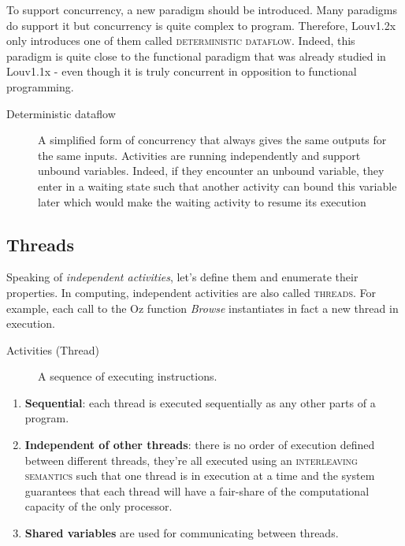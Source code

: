 \documentclass[11pt,a4paper,twoside,openright]{report}
\begin{document}
To support concurrency, a new paradigm should be introduced. Many paradigms do 
support it but concurrency is quite complex to program. Therefore, Louv1.2x 
only 
introduces one of them called \textsc{deterministic dataflow}. Indeed, this 
paradigm is quite close to the functional paradigm that was already studied in 
Louv1.1x - even though it is truly concurrent in opposition to functional 
programming.

\begin{description}
 \item[Deterministic dataflow] A  simplified form of concurrency that always 
gives the same outputs for the same inputs. Activities are running 
independently 
and support unbound variables. Indeed, if they encounter an unbound variable, 
they enter in a waiting state such that another activity can bound this 
variable 
later which would make the waiting activity to resume its execution
\end{description}

\subsection{Threads}

Speaking of \textit{independent activities}, let's define them and enumerate 
their properties. In computing, independent activities are also called 
\textsc{threads}. For example, each call to the Oz function \textit{Browse} 
instantiates in fact a new thread in execution.

\begin{description}
 \item[Activities (Thread)] A sequence of executing instructions.
\end{description}

\begin{enumerate}
	\item \textbf{Sequential}: each thread is executed sequentially as any 
other parts of a program. 
	\item \textbf{Independent of other threads}: there is no order of 
execution defined between different threads, they're all executed using an 
\textsc{interleaving semantics} such that one thread is in execution at a time 
and the system guarantees that each thread will have a fair-share of the 
computational capacity of the only processor.
	\item \textbf{Shared variables} are used for communicating between 
threads.
\end{enumerate}
\end{document}
